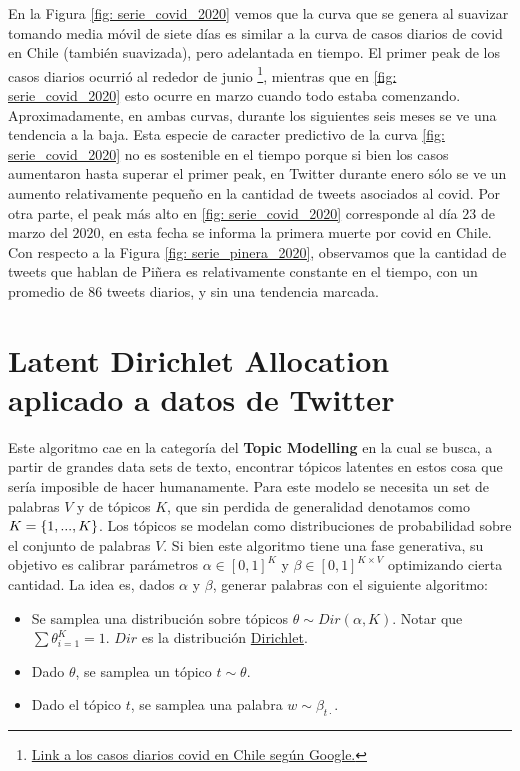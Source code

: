 \documentclass{article}
\begin{document}
\newpage


En la Figura \ref{fig: serie_covid_2020} vemos que la curva que se genera al suavizar tomando media móvil de siete días es similar a la curva de casos diarios de covid en Chile (también suavizada), pero adelantada en tiempo. El primer peak de los casos diarios ocurrió al rededor de junio \footnote{\href{https://www.google.com/search?client=firefox-b-d&q=covid+chile}{Link a los casos diarios covid en Chile según Google.}}, mientras que en \ref{fig: serie_covid_2020} esto ocurre en marzo cuando todo estaba comenzando. Aproximadamente, en ambas curvas, durante los siguientes seis meses se ve una tendencia a la baja. Esta especie de caracter predictivo de la curva \ref{fig: serie_covid_2020} no es sostenible en el tiempo porque si bien los casos aumentaron hasta superar el primer peak, en Twitter durante enero sólo se ve un aumento relativamente pequeño en la cantidad de tweets asociados al covid. Por otra parte, el peak más alto en \ref{fig: serie_covid_2020} corresponde al día $23$ de marzo del $2020$, en esta fecha se informa la primera muerte por covid en Chile.\\

Con respecto a la Figura \ref{fig: serie_pinera_2020}, observamos que la cantidad de tweets que hablan de Piñera es relativamente constante en el tiempo, con un promedio de $86$ tweets diarios, y sin una tendencia marcada. 
\newpage

\section{Latent Dirichlet Allocation aplicado a datos de Twitter}
	Este algoritmo cae en la categoría del \textbf{Topic Modelling} en la cual se busca, a partir de grandes data sets de texto, encontrar tópicos latentes en estos cosa que sería imposible de hacer humanamente. Para este modelo se necesita un set de palabras $V$ y de tópicos $K$, que sin perdida de generalidad denotamos como $K=\left\{1,...,K\right\}$. Los tópicos se modelan como distribuciones de probabilidad sobre el conjunto de palabras $V$. Si bien este algoritmo tiene una fase generativa, su objetivo es calibrar parámetros $\alpha\in [0,1]^{K}$ y $\beta\in[0,1]^{K\times V}$ optimizando cierta cantidad. La idea es, dados $\alpha$ y $\beta$, generar palabras con el siguiente algoritmo:
	
	\begin{itemize}
		\item Se samplea una distribución sobre tópicos $\theta\sim Dir(\alpha, K)$. Notar que $\sum \theta_{i=1}^K = 1$. $Dir$ es la distribución \href{https://en.wikipedia.org/wiki/Dirichlet_distribution}{Dirichlet}.
		\item Dado $\theta$, se samplea un tópico $t\sim\theta$.
		\item Dado el tópico $t$, se samplea una palabra $w\sim\beta_{t\cdot}$.
	\end{itemize}
	
\end{document}
